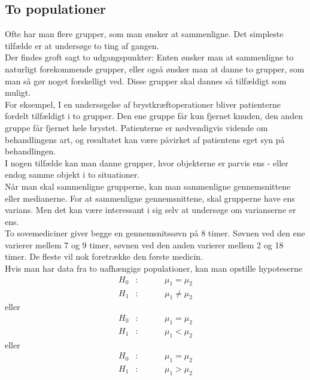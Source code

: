 \documentclass[11pt]{article}
\begin{document}
\subsection{To populationer}
Ofte har man flere grupper, som  man ønsker at sammenligne. Det simpleste tilfælde er at undersøge to ting af gangen.\\[0.2cm]
Der findes groft sagt to udgangspunkter: Enten ønsker man at sammenligne to naturligt forekommende grupper, eller også ønsker man at danne to grupper, som man så gør noget forskelligt ved. Disse grupper skal dannes så tilfældigt som muligt.\\[0.2cm]
For eksempel, I en undersøgelse af  brystkræftoperationer bliver patienterne fordelt tilfældigt i to grupper. Den ene gruppe får kun fjernet knuden, den anden gruppe får fjernet hele brystet. Patienterne er nødvendigvis vidende om behandlingens art, og resultatet kan være påvirket af patientens eget syn på behandlingen.\\[0.2cm]
I nogen tilfælde kan man danne grupper, hvor objekterne er parvis ens - eller endog samme objekt i to situationer.\\[0.2cm]
Når man skal sammenligne grupperne, kan man sammenligne gennemsnittene eller medianerne. For at sammenligne gennemsnittene, skal grupperne have ens varians. Men det kan være interessant i sig selv at undersøge om varianserne er ens.\\[0.2cm]
To sovemediciner giver begge en gennemsnitssøvn på 8 timer. Søvnen ved den ene varierer mellem 7 og 9 timer, søvnen ved den anden varierer mellem 2 og 18 timer. De fleste vil nok foretrække den første medicin.\\[0.2cm]
Hvis man har data fra to uafhængige populationer, kan man opstille hypoteserne
\begin{eqnarray*}
H_0&:&\hspace{1cm}\mu_1 = \mu_2\\
H_1&:&\hspace{1cm}\mu_1 \neq \mu_2
\end{eqnarray*}
eller
\begin{eqnarray*}
H_0&:&\hspace{1cm}\mu_1 = \mu_2\\
H_1&:&\hspace{1cm}\mu_1 < \mu_2
\end{eqnarray*}
eller
\begin{eqnarray*}
H_0&:&\hspace{1cm}\mu_1 = \mu_2\\
H_1&:&\hspace{1cm}\mu_1 > \mu_2
\end{eqnarray*}
\end{document}
